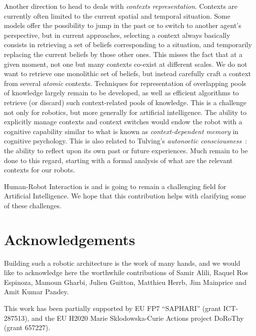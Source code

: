 \documentclass[preprint,3p,times]{elsarticle}
\begin{document}
Another direction to head to deals with \emph{contexts representation}.
Contexts are currently often limited to the current spatial and temporal
situation. Some models offer the possibility to jump in the past or to switch to
another agent's perspective, but in current approaches, selecting a context
always basically consists in retrieving a set of beliefs corresponding to a
situation, and temporarily replacing the current beliefs by those other ones.
This misses the fact that at a given moment, not one but many contexts co-exist
at different scales. We do not want to retrieve one monolithic set of beliefs,
but instead carefully craft a context from several \emph{atomic} contexts.
Techniques for representation of overlapping pools of knowledge largely remain
to be developed, as well as efficient algorithms to retrieve (or discard) such
context-related pools of knowledge. This is a challenge not only for robotics,
but more generally for artificial intelligence.  The ability to explicitly
manage contexts and context switches would endow the robot with a cognitive
capability similar to what is known as \emph{context-dependent memory} in
cognitive psychology. This is also related to Tulving's \emph{autonoetic
consciousness}~\cite{Tulving1985a}: the ability to reflect upon its own past or
future experiences.  Much remain to be done to this regard, starting with a
formal analysis of what are the relevant contexts for our robots.

Human-Robot Interaction is and is going to remain a challenging field for
Artificial Intelligence. We hope that this contribution helps with clarifying
some of these challenges.

\section*{Acknowledgements}

Building such a robotic architecture is the work of many hands, and we would
like to acknowledge here the worthwhile contributions of Samir Alili, Raquel Ros
Espinoza, Mamoun Gharbi, Julien Guitton, Matthieu Herrb, Jim Mainprice and Amit
Kumar Pandey.

This work has been partially supported by EU FP7 ``SAPHARI'' (grant ICT-287513),
and the EU H2020 Marie Sklodowska-Curie Actions project DoRoThy (grant 657227).




%

\end{document}
